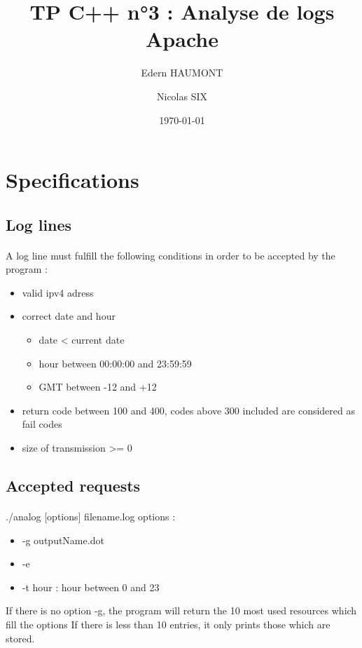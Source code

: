 \documentclass[a4paper, 12pts]{article}
\title{TP C++ n°3 : Analyse de logs Apache}
\author{Edern HAUMONT}
\author{Nicolas SIX}
\affil{B3111}
\date{\today}
\begin{document}

\maketitle



\section{Specifications}
\subsection{Log lines}
\paragraph{}
 A log line must fulfill the following conditions in order to be accepted by the program :
 \begin{itemize}[label=$\square$]
 \item valid ipv4 adress
 \item correct date and hour
 \begin{itemize}
 \item date < current date
 \item hour between 00:00:00 and 23:59:59
 \item GMT between -12 and +12
 \end{itemize}
 \item return code between 100 and 400, codes above 300 included are considered as fail codes
 \item size of transmission >= 0
 \end{itemize}
 
\subsection{Accepted requests}
\paragraph{}
 ./analog [options] filename.log
 options :
 \begin{itemize}[label=$\square$]
 \item -g outputName.dot
 \item -e
 \item -t hour : hour between 0 and 23
 \end{itemize}
 If there is no option -g, the program will return the 10 most used resources which fill the options
 If there is less than 10 entries, it only prints those which are stored.
\end{document}
